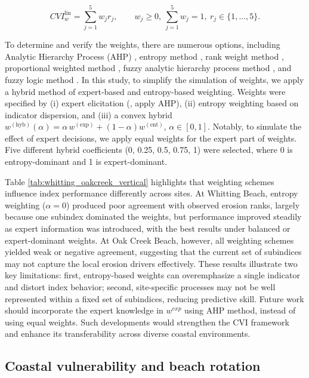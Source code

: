 \begin{equation}
CVI^{\text{lin}}_w = \sum_{j=1}^{5} w_j r_j,\qquad
w_j \ge 0,\ \sum_{j=1}^{5} w_j = 1,\ r_j \in \{1,\ldots,5\}.
\end{equation}

To determine and verify the weights, there are numerous options, including
Analytic Hierarchy Process (AHP)
\citep{mosadeghi2015comparison,cabrera2019flood,saffarian2020measuring}, entropy
method \citep{cabrera2020flood}, rank weight method \citep{alam2020cyclone},
proportional weighted method \citep{dou2018flood}, fuzzy analytic hierarchy
process method \citep{wijitkosum2019fuzzy}, and fuzzy logic method
\citep{hoque2021cyclone}. In this study, to simplify the simulation of weights, we
apply a hybrid method of expert-based and entropy-based weighting. Weights
were specified by (i) expert elicitation (\eg, apply AHP), (ii) entropy
weighting based on indicator dispersion, and (iii) a convex hybrid
\(w^{(\mathrm{hyb})}(\alpha) = \alpha\,w^{(\mathrm{exp})} +
(1-\alpha)w^{(\mathrm{ent})}\), \(\alpha\in[0,1]\). Notably, to simulate the effect of expert
decisions, we apply equal weights for the expert part of weights. Five different hybrid 
coefficients (0, 0.25, 0.5, 0.75, 1) were selected, where 0 is entropy-dominant and 1 is expert-dominant.

Table \ref{tab:whitting_oakcreek_vertical} highlights that weighting schemes
influence index performance differently across sites. At Whitting Beach, entropy
weighting (\(\alpha=0\)) produced poor agreement with observed erosion ranks,
largely because one subindex dominated the weights, but performance improved
steadily as expert information was introduced, with the best results under
balanced or expert-dominant weights. At Oak Creek Beach, however, all weighting
schemes yielded weak or negative agreement, suggesting that the current set of
subindices may not capture the local erosion drivers effectively. These results
illustrate two key limitations: first, entropy-based weights can overemphasize a
single indicator and distort index behavior; second, site-specific processes may
not be well represented within a fixed set of subindices, reducing predictive
skill. Future work should incorporate the expert knowledge in $w^{exp}$ using
AHP method, instead of using equal weights. Such developments would strengthen
the CVI framework and enhance its transferability across diverse coastal
environments.




\subsection{Coastal vulnerability and beach rotation}
\label{rotation}

